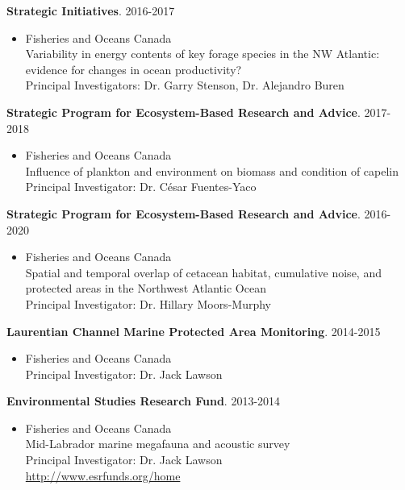 \documentclass{res}
\begin{document}
\begin{resume}
\textbf{Strategic Initiatives}. 2016-2017
\begin{itemize} %
	\item[]Fisheries and Oceans Canada\\
Variability in energy contents of key forage species in the NW Atlantic: evidence for changes in ocean productivity?\\
Principal Investigators: Dr. Garry Stenson, Dr. Alejandro Buren
\end{itemize}

\textbf{Strategic Program for Ecosystem-Based Research and Advice}. 2017-2018
\begin{itemize} %
	\item[]Fisheries and Oceans Canada\\
Influence of plankton and environment on biomass and condition of capelin\\
Principal Investigator: Dr. César Fuentes-Yaco
\end{itemize}

\textbf{Strategic Program for Ecosystem-Based Research and Advice}. 2016-2020
\begin{itemize} %
	\item[]Fisheries and Oceans Canada\\
Spatial and temporal overlap of cetacean habitat, cumulative noise, and protected areas in the Northwest Atlantic Ocean\\
Principal Investigator: Dr. Hillary Moors-Murphy
\end{itemize}

\textbf{Laurentian Channel Marine Protected Area Monitoring}. 2014-2015
\begin{itemize} %
	\item[]Fisheries and Oceans Canada\\
Principal Investigator: Dr. Jack Lawson
\end{itemize}

\textbf{Environmental Studies Research Fund}. 2013-2014
\begin{itemize} %
	\item[]Fisheries and Oceans Canada\\
Mid-Labrador marine megafauna and acoustic survey\\
Principal Investigator: Dr. Jack Lawson\\
\url{http://www.esrfunds.org/home}
\end{itemize}


\end{resume}
\end{document}
